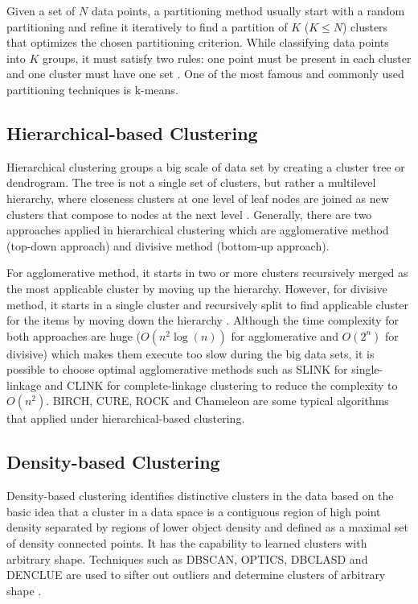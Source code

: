 \documentclass[sigconf]{acmart}
\begin{document}
Given a set of $N$ data points, a partitioning method usually start with a random partitioning and refine it iteratively to find a partition of $K$ ($K \leq N$) clusters that optimizes the chosen partitioning criterion. While classifying data points into $K$ groups, it must satisfy two rules: one point must be present in each cluster and one cluster must have one set \cite{dcar}. One of the most famous and commonly used partitioning techniques is k-means.

\subsection{Hierarchical-based Clustering}

Hierarchical clustering groups a big scale of data set by creating a cluster tree or dendrogram. The tree is not a single set of clusters, but rather a multilevel hierarchy, where closeness clusters at one level of leaf nodes are joined as new clusters that compose to nodes at the next level \cite{math}. Generally, there are two approaches applied in hierarchical clustering which are agglomerative method (top-down approach) and divisive method (bottom-up approach).

For agglomerative method, it starts in two or more clusters recursively merged as the most applicable cluster by moving up the hierarchy. However, for divisive method, it starts in a single cluster and recursively split to find applicable cluster for the items by moving down the hierarchy \cite{dcar}. Although the time complexity for both approaches are huge ($O(n^2\log(n))$ for agglomerative and $O(2^n)$ for divisive) which makes them execute too slow during the big data sets, it is possible to choose optimal agglomerative methods such as SLINK for single-linkage and CLINK for complete-linkage clustering to reduce the complexity to $O(n^2)$. BIRCH, CURE, ROCK and Chameleon are some typical algorithms that applied under hierarchical-based clustering.

\subsection{Density-based Clustering}

Density-based clustering identifies distinctive clusters in the data based on the basic idea that a cluster in a data space is a contiguous region of high point density separated by regions of lower object density \cite{jsdbc} and defined as a maximal set of density connected points. It has the capability to learned clusters with arbitrary shape. Techniques such as DBSCAN, OPTICS, DBCLASD and DENCLUE are used to sifter out outliers and determine clusters of arbitrary shape \cite{dcar}.
\end{document}
